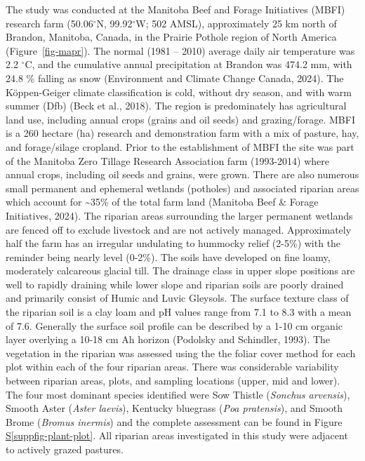 \documentclass[
]{agujournal2019}
\newcommand*\quartosuppfigref[1]{Figure \hyperref[#1]{S\ref{#1}}}
\begin{document}
The study was conducted at the Manitoba Beef and Forage Initiatives
(MBFI) research farm (50.06\(^\circ\)N, 99.92\(^\circ\)W; 502 AMSL),
approximately 25 km north of Brandon, Manitoba, Canada, in the Prairie
Pothole region of North America (Figure~\ref{fig-mapr}). The normal
(1981 -- 2010) average daily air temperature was 2.2 \(^\circ\)C, and
the cumulative annual precipitation at Brandon was 474.2 mm, with 24.8
\% falling as snow (Environment and Climate Change Canada, 2024). The
Köppen-Geiger climate classification is cold, without dry season, and
with warm summer (Dfb) (Beck et al., 2018). The region is predominately
has agricultural land use, including annual crops (grains and oil seeds)
and grazing/forage. MBFI is a 260 hectare (ha) research and
demonstration farm with a mix of pasture, hay, and forage/silage
cropland. Prior to the establishment of MBFI the site was part of the
Manitoba Zero Tillage Research Association farm (1993-2014) where annual
crops, including oil seeds and grains, were grown. There are also
numerous small permanent and ephemeral wetlands (potholes) and
associated riparian areas which account for \textasciitilde35\% of the
total farm land (Manitoba Beef \& Forage Initiatives, 2024). The
riparian areas surrounding the larger permanent wetlands are fenced off
to exclude livestock and are not actively managed. Approximately half
the farm has an irregular undulating to hummocky relief (2-5\%) with the
reminder being nearly level (0-2\%). The soils have developed on fine
loamy, moderately calcareous glacial till. The drainage class in upper
slope positions are well to rapidly draining while lower slope and
riparian soils are poorly drained and primarily consist of Humic and
Luvic Gleysols. The surface texture class of the riparian soil is a clay
loam and pH values range from 7.1 to 8.3 with a mean of 7.6. Generally
the surface soil profile can be described by a 1-10 cm organic layer
overlying a 10-18 cm Ah horizon (Podolsky and Schindler, 1993). The
vegetation in the riparian was assessed using the the foliar cover
method for each plot within each of the four riparian areas. There was
considerable variability between riparian areas, plots, and sampling
locations (upper, mid and lower). The four most dominant species
identified were Sow Thistle (\emph{Sonchus arvensis}), Smooth Aster
(\emph{Aster laevis}), Kentucky bluegrass (\emph{Poa pratensis}), and
Smooth Brome (\emph{Bromus inermis}) and the complete assessment can be
found in \quartosuppfigref{suppfig-plant-plot}. All riparian areas
investigated in this study were adjacent to actively grazed pastures.
\end{document}
